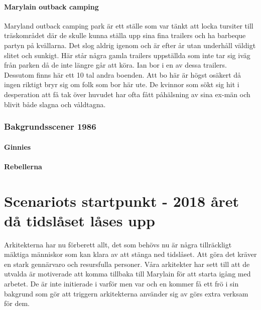 \documentclass[a5paper,10pt]{report}
\begin{document}
\subsubsection{Marylain outback camping} \label{camping}
Maryland outback camping park är ett ställe som var tänkt att locka tursiter till träskområdet där de skulle kunna ställa upp sina fina trailers och ha barbeque partyn på kvällarna. Det slog aldrig igenom och är efter år utan underhåll väldigt slitet och sunkigt. Här står några gamla trailers uppställda som inte tar sig iväg från parken då de inte längre går att köra. Ian bor i en av dessa trailers. Dessutom finns här ett 10 tal andra boenden. Att bo här är högst osäkert då ingen riktigt bryr sig om folk som bor här ute. De kvinnor som sökt sig hit i desperation att få tak över huvudet har ofta fått påhälsning av sina ex-män och blivit både slagna och våldtagna.
\subsection{Bakgrundsscener 1986}
\subsubsection{Ginnies}
\subsubsection{Rebellerna}
\clearpage
\chapter{Scenariots startpunkt - 2018 året då tidslåset låses upp}
Arkitekterna har nu förberett allt, det som behövs nu är några tillräckligt mäktiga människor som kan klara av att stänga ned tidslåset. Att göra det kräver en stark gennärvaro och resursfulla personer. Våra arkitekter har sett till att de utvalda är motiverade att komma tillbaka till Marylain för att starta igång med arbetet. De är inte initierade i varför men var och en kommer få ett frö i sin bakgrund som gör att triggern arkitekterna använder sig av görs extra verksam för dem.
\end{document}
